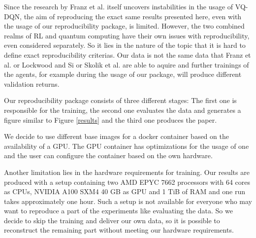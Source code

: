 Since the research by Franz et al. itself uncovers instabilities in the usage of \ac{VQ-DQN}, the aim of reproducing the exact same results presented here, even with the usage of our reproducibility package, is limited. 
However, the two combined realms of \ac{RL}\autocite{rlrepro} and quantum computing\autocite{quantumrepro} have their own issues with reproducibility, even considered separately. 
So it lies in the nature of the topic that it is hard to define exact reproducibility criterias.
Our data is not the same data that Franz et al. or Lockwood and Si or Skolik et al. are able to aquire and further trainings of the agents, for example during the usage of our package, will produce different validation returns.


Our reproducibility package consists of three different stages: The first one is responsible for the training, the second one evaluates the data and generates a figure similar to Figure \ref{results} and the third one produces the paper. 

We decide to use different base images for a docker container based on the availability of a GPU. 
The GPU container has optimizations for the usage of one and the user can configure the container based on the own hardware. 

Another limitation lies in the hardware requirements for training. 
Our results are produced with a setup containing two AMD EPYC 7662 processors with 64 cores as CPUs, NVIDIA A100 SXM4 40 GB as GPU and 1 TiB of RAM and one run takes approximately one hour. 
Such a setup is not available for everyone who may want to reproduce a part of the experiments like evaluating the data. 
So we decide to skip the training and deliver our own data, so it is possible to reconstruct the remaining part without meeting our hardware requirements. 

